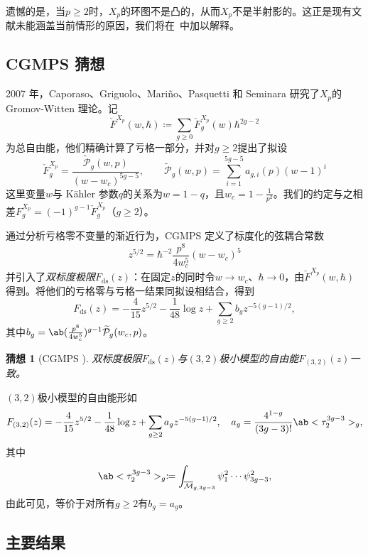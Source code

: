 \documentclass{amsart}
\newtheorem{conj}[thm]{猜想}
\theoremstyle{definition}
\theoremstyle{remark}
\theoremstyle{plain}
\theoremstyle{definition}
\theoremstyle{remark}
\newcommand{\Mbar}{\overline{\mathcal{M}}}
\newcommand{\mc}[1]{\mathcal{#1}}
\newcommand{\mr}[1]{\mathrm{#1}}
\newcommand{\wt}[1]{\widetilde{#1}}
\newcommand{\1}{\mathbf{1}}
\newcommand{\2}{\mathbf{2}}
\newcommand{\3}{\mathbf{3}}
\begin{document}
遗憾的是，当\(p \geq 2\)时，\(X_p\)的环图不是凸的，从而\(X_p\)不是半射影的。这正是现有文献未能涵盖当前情形的原因，我们将在~中加以解释。

\subsection{CGMPS 猜想}%
\label{sub:The conjecture of CGMPS}

2007 年，Caporaso、Griguolo、Mari\~{n}o、Pasquetti 和 Seminara 研究了\(X_p\)的 Gromov-Witten 理论。记
\[ \check{F}^{X_p}(w,\hbar) \coloneqq \sum_{g \geq 0} \check{F}_g^{X_p}(w) \hbar^{2g-2} \]
为总自由能，他们精确计算了亏格一部分，并对\(g \geq 2\)提出了拟设
\begin{equation}\label{eqn:cgmps ansatz}
    \check{F}_g^{X_p} = \frac{\wt{\mc{P}}_g(w,p)}{(w-w_c)^{5g-5}}, \qquad \wt{\mc{P}}_g(w,p) = \sum_{i=1}^{5g-5} a_{g,i}(p)(w-1)^i
\end{equation}
这里变量\(w\)与 Kähler 参数\(q\)的关系为\(w = 1-q\)，且\(w_c = 1 - \frac{1}{p^2}\)。我们的约定与之相差\(F_g^{X_p} = (-1)^{g-1}\check{F}_g^{X_p}\)（\(g \geq 2\)）。

通过分析亏格零不变量的渐近行为，CGMPS 定义了标度化的弦耦合常数
\[ z^{5/2} = \hbar^{-2} \frac{p^8}{4w_c^5}(w-w_c)^5 \]
并引入了\textit{双标度极限}\(F_{\mr{ds}}(z)\)：在固定\(z\)的同时令\(w \to w_c\)、\(\hbar \to 0\)，由\(\check{F}^{X_p}(w,\hbar)\)得到。将他们的亏格零与亏格一结果同拟设相结合，得到
\[ F_{\mr{ds}}(z) = -\frac{4}{15}z^{5/2} - \frac{1}{48}\log z + \sum_{g \geq 2} b_g z^{-5(g-1)/2}, \]
其中\(b_g = \ab(\frac{p^8}{4w_c^5})^{g-1}\wt{\mc{P}}_g(w_c,p)\)。

\begin{conj}[CGMPS {\cite{CGMPS2007}}]%
\label{conj:cgmps}
    双标度极限\(F_{\mr{ds}}(z)\)与\((3,2)\)极小模型的自由能\(F_{(3,2)}(z)\)一致。
\end{conj}

\((3,2)\)极小模型的自由能形如
\[ F_{(3,2)}(z) = -\frac{4}{15}z^{5/2} - \frac{1}{48}\log z + \sum_{g\geq2} a_g z^{-5(g-1)/2}, \quad a_g = \frac{4^{1-g}}{(3g-3)!}\ab<\tau_2^{3g-3}>_g, \]
其中
\[ \ab<\tau_2^{3g-3}>_g \coloneqq \int_{\Mbar_{g,3g-3}} \psi_1^2 \cdots \psi_{3g-3}^2, \]
由此可见，等价于对所有\(g \geq 2\)有\(b_g = a_g\)。

\subsection{主要结果}%
\label{sub:The main results (Guo local P1)}
\end{document}
